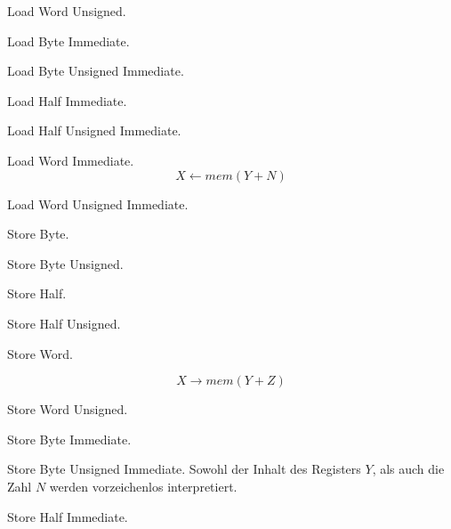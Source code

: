 \glqq Load Word Unsigned\grqq.


\glqq Load Byte Immediate\grqq.


\glqq Load Byte Unsigned Immediate\grqq.



\glqq Load Half Immediate\grqq.


\glqq Load Half Unsigned Immediate\grqq.


\glqq Load Word Immediate\grqq.
\[
    X \gets mem(Y + N)
\]


\glqq Load Word Unsigned Immediate\grqq.



\glqq Store Byte\grqq.



\glqq Store Byte Unsigned\grqq.



\glqq Store Half\grqq.



\glqq Store Half Unsigned\grqq.



\glqq Store Word\grqq.

\[
    X \to mem(Y + Z)
\]


\glqq Store Word Unsigned\grqq.



\glqq Store Byte Immediate\grqq.



\glqq Store Byte Unsigned Immediate\grqq.
Sowohl der Inhalt des Registers $Y$, als auch die Zahl $N$ werden 
vorzeichenlos interpretiert.



\glqq Store Half Immediate\grqq.



